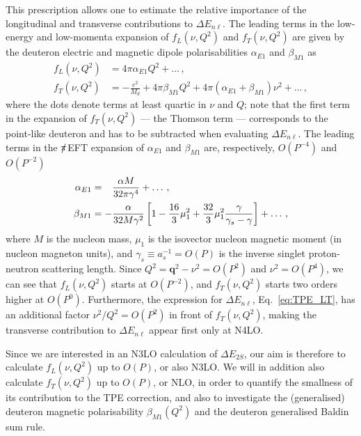 \documentclass[prl,
twocolumn,
showpacs,preprintnumbers,amsmath,amssymb,
superscriptaddress,
a4paper,nofootinbib,longbibliography]{revtex4-2}
\def\hpm{\hphantom{-}}
\def\bv#1{\boldsymbol{#1}}
\def\piEFT/{$\slashed{\pi}$EFT}
\begin{document}
This prescription allows one to estimate the relative importance of the longitudinal and transverse contributions to $\Delta E_{n\ell}$. The leading terms in the low-energy and low-momenta expansion of $f_L(\nu,Q^2)$ and $f_T(\nu,Q^2)$ are given by the deuteron electric and magnetic dipole polarisabilities $\alpha_{E1}$ and $\beta_{M1}$ as~\cite{Drechsel:2002ar}
\begin{align}
    f_L(\nu,Q^2) &= 4\pi \alpha_{E1}Q^2 + \dots\,,\\
    f_T(\nu,Q^2) &=-\frac{e^2}{M_d}+4\pi \beta_{M1}Q^2 + 4\pi(\alpha_{E1}+\beta_{M1})\nu^2+\dots\,,
\end{align}
where the dots denote terms at least quartic in $\nu$ and $Q$; note that the first term in the expansion of $f_T(\nu,Q^2)$ --- the Thomson term --- corresponds to the point-like deuteron and has to be subtracted when evaluating $\Delta E_{n\ell}$. The leading terms in the \piEFT/
expansion of $\alpha_{E1}$ and $\beta_{M1}$ are, respectively, $O(P^{-4})$ and $O(P^{-2})$~\cite{Chen:1998vi,Phillips:1999hh,Ji:2003ia}
\begin{align}
\alpha_{E1} &= \hpm\frac{\alpha M}{32\pi \gamma^4}+\dots\,,\\
\beta_{M1}  &= -\frac{\alpha}{32M\gamma^2}\left[
1 - \frac{16}{3}\mu_1^2 + \frac{32}{3}\mu_1^2\frac{\gamma}{\gamma_s-\gamma}
\right]+\dots\,,
\end{align}
where $M$ is the nucleon mass, $\mu_1$ is the isovector nucleon magnetic moment (in nucleon magneton units), and $\gamma_s\equiv a_s^{-1}=O(P)$ is the inverse singlet proton-neutron scattering length. Since $Q^2=\bv{q}^2-\nu^2=O(P^2)$ and $\nu^2=O(P^4)$, we can see that $f_L(\nu,Q^2)$ starts at $O(P^{-2})$, and $f_T(\nu,Q^2)$ starts two orders higher at $O(P^0)$. Furthermore, the expression for $\Delta E_{n\ell}$, Eq.~\eqref{eq:TPE_LT}, has an additional factor $\nu^2/Q^2=O(P^2)$ in front of $f_T(\nu,Q^2)$, making the transverse contribution to $\Delta E_{n\ell}$ appear first only at N4LO. 

Since we are interested in an N3LO calculation of $\Delta E_{2S}$, our aim is therefore
to calculate $f_L(\nu,Q^2)$ up to $O(P)$, or also N3LO. We will in addition also calculate $f_T(\nu,Q^2)$ up to $O(P)$, or NLO, in order to quantify the smallness of its contribution to the TPE correction, and also to investigate the (generalised) deuteron magnetic polarisability $\beta_{M1}(Q^2)$ and the deuteron generalised Baldin sum rule.

\end{document}
